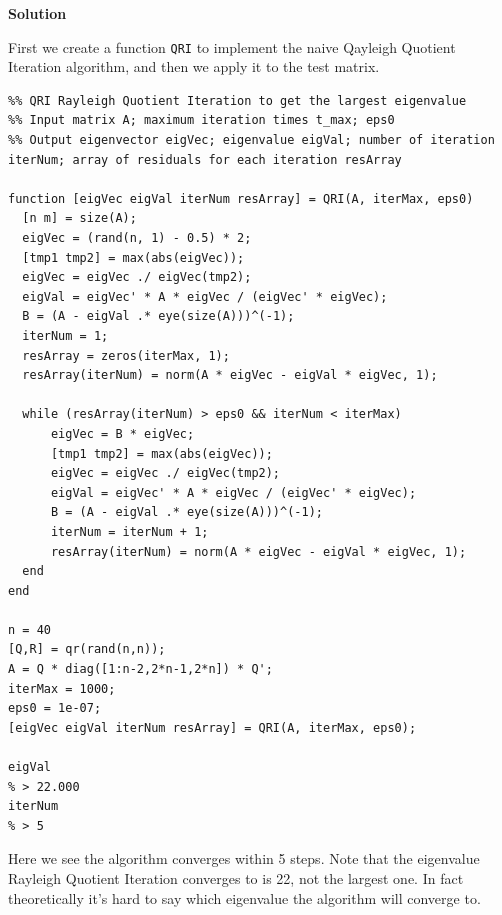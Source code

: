 \documentclass[12pt,oneside,a4paper]{article}
\newcommand{\solution}
{
    \vspace{15pt}
    \noindent\ignorespaces\textbf{\large Solution}\par
}
\newcommand{\m}[1]{\texttt{{#1}}}
\begin{document}
\solution
First we create a function \m{QRI} to implement the naive Qayleigh Quotient Iteration algorithm, and then we apply it to the test matrix.

\begin{lstlisting}
%% QRI Rayleigh Quotient Iteration to get the largest eigenvalue
%% Input matrix A; maximum iteration times t_max; eps0
%% Output eigenvector eigVec; eigenvalue eigVal; number of iteration iterNum; array of residuals for each iteration resArray

function [eigVec eigVal iterNum resArray] = QRI(A, iterMax, eps0)
  [n m] = size(A);
  eigVec = (rand(n, 1) - 0.5) * 2;
  [tmp1 tmp2] = max(abs(eigVec));
  eigVec = eigVec ./ eigVec(tmp2);
  eigVal = eigVec' * A * eigVec / (eigVec' * eigVec);
  B = (A - eigVal .* eye(size(A)))^(-1);
  iterNum = 1;
  resArray = zeros(iterMax, 1);
  resArray(iterNum) = norm(A * eigVec - eigVal * eigVec, 1);

  while (resArray(iterNum) > eps0 && iterNum < iterMax)
      eigVec = B * eigVec;
      [tmp1 tmp2] = max(abs(eigVec));
      eigVec = eigVec ./ eigVec(tmp2);
      eigVal = eigVec' * A * eigVec / (eigVec' * eigVec);
      B = (A - eigVal .* eye(size(A)))^(-1);
      iterNum = iterNum + 1;
      resArray(iterNum) = norm(A * eigVec - eigVal * eigVec, 1);
  end
end

n = 40
[Q,R] = qr(rand(n,n));
A = Q * diag([1:n-2,2*n-1,2*n]) * Q';
iterMax = 1000;
eps0 = 1e-07;
[eigVec eigVal iterNum resArray] = QRI(A, iterMax, eps0);

eigVal
% > 22.000
iterNum
% > 5
\end{lstlisting}

Here we see the algorithm converges within 5 steps. Note that the eigenvalue Rayleigh Quotient Iteration converges to is 22, not the largest one. In fact theoretically it's hard to say which eigenvalue the algorithm will converge to.
\end{document}
